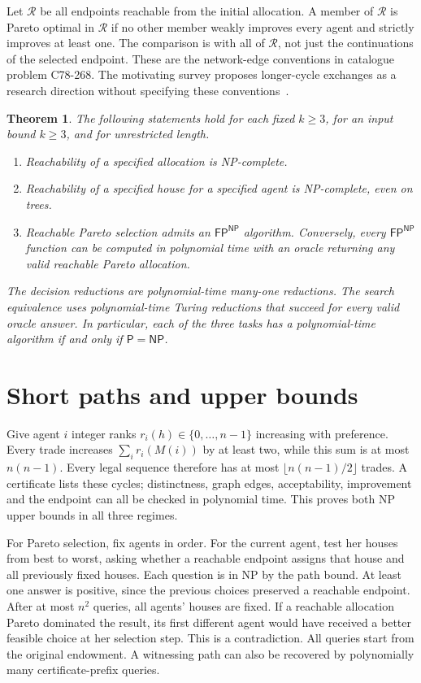 \documentclass[11pt]{article}
\newtheorem{theorem}{Theorem}
\newcommand{\NP}{\mathsf{NP}}
\newcommand{\FP}{\mathsf{FP}}
\newcommand{\RA}{\mathcal R}
\begin{document}
Let $\RA$ be all endpoints reachable from the initial allocation.
A member of $\RA$ is Pareto optimal in $\RA$ if no other member weakly
improves every agent and strictly improves at least one. The comparison
is with all of $\RA$, not just the continuations of the selected endpoint.
These are the network-edge conventions in catalogue problem C78-268.
The motivating survey proposes longer-cycle exchanges as a research
direction without specifying these conventions~\cite[\S3.1.3]{survey}.

\begin{theorem}\label{main}
The following statements hold for each fixed $k\geq3$, for an input
bound $k\geq3$, and for unrestricted length.
\begin{enumerate}
\item Reachability of a specified allocation is NP-complete.
\item Reachability of a specified house for a specified agent is NP-complete,
      even on trees.
\item Reachable Pareto selection admits an $\FP^{\NP}$ algorithm.
      Conversely, every $\FP^{\NP}$ function can be computed in polynomial
      time with an oracle returning any valid reachable Pareto allocation.
\end{enumerate}
The decision reductions are polynomial-time many-one reductions. The
search equivalence uses polynomial-time Turing reductions that succeed
for every valid oracle answer. In particular, each of the three tasks
has a polynomial-time algorithm if and only if $\mathsf P=\NP$.
\end{theorem}

\section{Short paths and upper bounds}
Give agent $i$ integer ranks $r_i(h)\in\{0,\ldots,n-1\}$ increasing
with preference. Every trade increases $\sum_i r_i(M(i))$ by at least
two, while this sum is at most $n(n-1)$. Every legal sequence therefore
has at most $\lfloor n(n-1)/2\rfloor$ trades. A certificate lists these
cycles; distinctness, graph edges, acceptability, improvement and the
endpoint can all be checked in polynomial time. This proves both NP
upper bounds in all three regimes.

For Pareto selection, fix agents in order. For the current agent,
test her houses from best to worst, asking whether a reachable endpoint
assigns that house and all previously fixed houses. Each question is
in NP by the path bound. At least one answer is positive, since the
previous choices preserved a reachable endpoint. After at most $n^2$
queries, all agents' houses are fixed. If a reachable allocation Pareto
dominated the result, its first different agent would have received a
better feasible choice at her selection step. This is a contradiction.
All queries start from the original endowment. A witnessing path can
also be recovered by polynomially many certificate-prefix queries.
\end{document}
